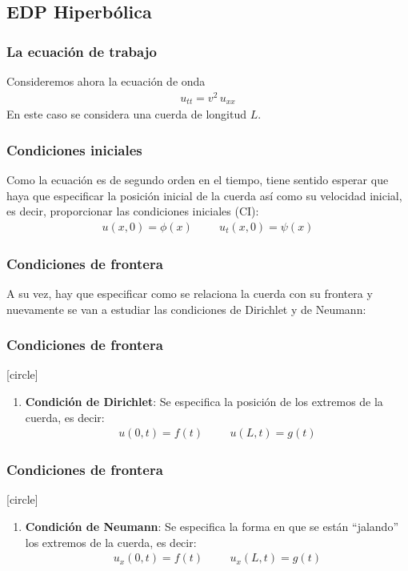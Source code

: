 \subsection{EDP Hiperbólica}
\begin{frame}
\frametitle{La ecuación de trabajo}
Consideremos ahora la ecuación de onda
\begin{align*}
u_{tt} = v^{2} \, u_{xx}
\end{align*}
En este caso se considera una cuerda de longitud $L$. 
\end{frame}
\begin{frame}
\frametitle{Condiciones iniciales}
Como la ecuación es de segundo orden en el tiempo, tiene sentido esperar que haya que especificar la posición inicial de la cuerda así como su velocidad inicial, es decir, proporcionar las condiciones iniciales (CI):
\begin{align}
u(x, 0) = \phi (x) \hspace{1cm} u_{t}(x, 0) = \psi (x)
\label{eq:ecuacion_06_02_07}
\end{align}
\end{frame}
\begin{frame}
\frametitle{Condiciones de frontera}
A su vez, hay que especificar como se relaciona la cuerda con su frontera y nuevamente se van a estudiar las condiciones de Dirichlet y de Neumann:
\end{frame}
\begin{frame}
\frametitle{Condiciones de frontera}
[circle]
\begin{enumerate}
\item \textbf{Condición de Dirichlet}: Se especifica la posición de los extremos de la cuerda, es decir:
\begin{align}
u(0, t) = f (t) \hspace{1cm} u(L, t) = g(t)
\label{eq:ecuacion_06_02_08}   
\end{align}
\seti
\end{enumerate}
\end{frame}
\begin{frame}
\frametitle{Condiciones de frontera}
[circle]
\begin{enumerate}
\conti
\item \textbf{Condición de Neumann}: Se especifica la forma en que se están \enquote{jalando} los extremos de la cuerda, es decir:
\begin{align}
u_{x}(0, t) = f(t) \hspace{1cm} u_{x}(L,t) = g(t)
\label{eq:ecuacion_06_02_09}    
\end{align}
\end{enumerate}
\end{frame}
